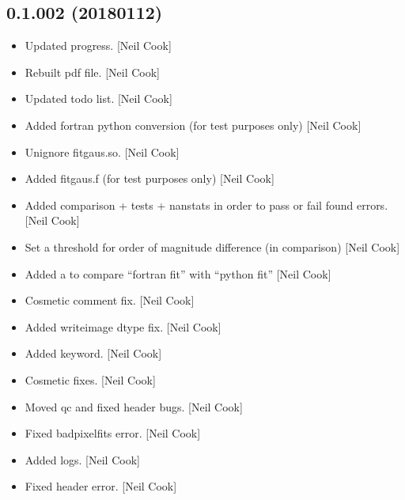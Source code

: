 \documentclass[a4paper,10pt,english]{report}
\begin{document}
\subsection{0.1.002 (2018\sphinxhyphen{}01\sphinxhyphen{}12)}
\label{\detokenize{misc/changelog:id520}}\begin{itemize}
\item {} 
Updated progress. {[}Neil Cook{]}

\item {} 
Rebuilt pdf file. {[}Neil Cook{]}

\item {} 
Updated todo list. {[}Neil Cook{]}

\item {} 
Added fortran python conversion (for test purposes only) {[}Neil Cook{]}

\item {} 
Unignore fitgaus.so. {[}Neil Cook{]}

\item {} 
Added fitgaus.f (for test purposes only) {[}Neil Cook{]}

\item {} 
Added comparison + tests + nanstats in order to pass or fail found
errors. {[}Neil Cook{]}

\item {} 
Set a threshold for order of magnitude difference (in comparison)
{[}Neil Cook{]}

\item {} 
Added a  to compare “fortran fit” with “python fit” {[}Neil
Cook{]}

\item {} 
Cosmetic comment fix. {[}Neil Cook{]}

\item {} 
Added writeimage dtype fix. {[}Neil Cook{]}

\item {} 
Added  keyword. {[}Neil Cook{]}

\item {} 
Cosmetic fixes. {[}Neil Cook{]}

\item {} 
Moved qc and fixed header bugs. {[}Neil Cook{]}

\item {} 
Fixed badpixelfits error. {[}Neil Cook{]}

\item {} 
Added logs. {[}Neil Cook{]}

\item {} 
Fixed header error. {[}Neil Cook{]}

\end{itemize}
\end{document}
